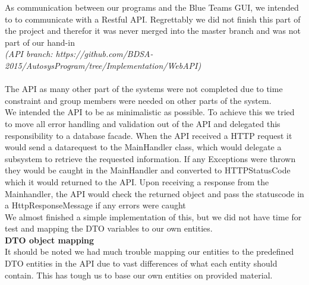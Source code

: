 As communication between our programs and the Blue Teams GUI, we intended to to communicate with a Restful API. Regrettably we did not finish this part of the project and therefor it was never merged into the master branch and was not part of our hand-in\\
\textit{(API branch: https://github.com/BDSA-2015/AutosysProgram/tree/Implementation/WebAPI)}\\\\
The API as many other part of the systems were not completed due to time constraint and group members were needed on other parts of the system.\\
We intended the API to be as minimalistic as possible. To achieve this we tried to move all error handling and validation out of the API and delegated this responsibility to a database facade. When the API received a HTTP request it would send a datarequest to the  MainHandler class, which would delegate a subsystem to retrieve the requested information. If any Exceptions were thrown  they would be caught in the MainHandler and converted to HTTPStatusCode which it would returned to the API. Upon receiving a response from the Mainhandler, the API would check the returned object and pass the statuscode in a HttpResponseMessage if any errors were caught\\
We almost finished a simple implementation of this, but we did not have time for test and mapping the DTO variables to our own entities.\\
\textbf{DTO object mapping}\\
It should be noted we had much trouble mapping our entities to the predefined DTO entities in the API due to vast differences of what each entity should contain. This has tough us to base our own entities on provided material.
